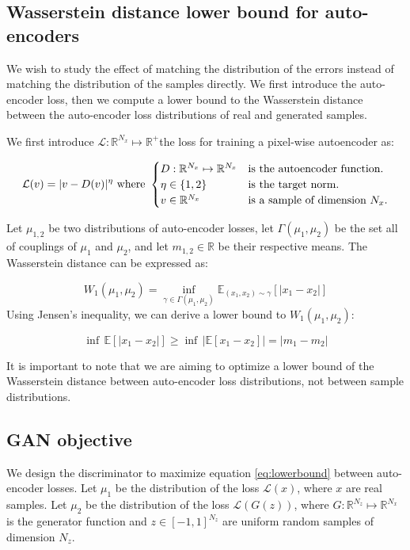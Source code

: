 \documentclass[english]{article}
\begin{document}
\subsection{Wasserstein distance lower bound for auto-encoders}

We wish to study the effect of matching the distribution of the errors
instead of matching the distribution of the samples directly. We first
introduce the auto-encoder loss, then we compute a lower bound to
the Wasserstein distance between the auto-encoder loss distributions
of real and generated samples. 

We first introduce $\mathcal{L}:\mathbb{R}^{N_{x}}\mapsto\mathbb{R}^{+}$the
loss for training a pixel-wise autoencoder as:

\[
\mathcal{L}(v)=|v-D(v)|^{\eta}\textrm{ where }\begin{cases}
D:\mathbb{R}^{N_{x}}\mapsto\mathbb{R}^{N_{x}} & \textrm{is the autoencoder function.}\\
\eta\in\left\{ 1,2\right\}  & \textrm{is the target norm}.\\
v\in\mathbb{R}^{N_{x}} & \textrm{is a sample of dimension \ensuremath{N_{x}}.}
\end{cases}
\]


Let $\mu_{1,2}$ be two distributions of auto-encoder losses, let
$\Gamma(\mu_{1},\mu_{2})$ be the set all of couplings of $\mu_{1}$
and $\mu_{2}$, and let $m_{1,2}\in\mathbb{R}$ be their respective
means. The Wasserstein distance can be expressed as:

\[
W_{1}(\mu_{1},\mu_{2})=\inf_{\gamma\in\Gamma(\mu_{1},\mu_{2})}\mathbb{E}_{(x_{1},x_{2})\sim\gamma}[|x_{1}-x_{2}|]
\]
 Using Jensen's inequality, we can derive a lower bound to $W_{1}(\mu_{1},\mu_{2})$:

\begin{equation}
\inf\,\mathbb{E}[|x_{1}-x_{2}|]\geqslant\inf\,|\mathbb{E}[x_{1}-x_{2}]|=|m_{1}-m_{2}|\label{eq:lowerbound}
\end{equation}


It is important to note that we are aiming to optimize a lower bound
of the Wasserstein distance between auto-encoder loss distributions,
not between sample distributions. 


\subsection{GAN objective}

We design the discriminator to maximize equation \ref{eq:lowerbound}
between auto-encoder losses. Let $\mu_{1}$ be the distribution of
the loss $\mathcal{L}(x)$, where $x$ are real samples. Let $\mu_{2}$
be the distribution of the loss $\mathcal{L}(G(z))$, where $G:\mathbb{R}^{N_{z}}\mapsto\mathbb{R}^{N_{x}}$
is the generator function and $z\in[-1,1]^{N_{z}}$ are uniform random
samples of dimension $N_{z}$.
\end{document}
